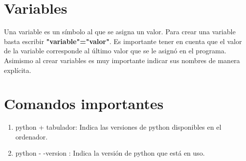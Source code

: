 \documentclass[letter paper, 12pt, oneside]{article}
\begin{document}
\section{Variables}

Una variable es un símbolo al que se asigna un valor. Para crear una variable basta escribir \textbf{"variable"="valor"}. Es importante tener en cuenta que el valor de la variable corresponde al último valor que se le asignó en el programa. Asimismo al crear variables es muy importante indicar sus nombres de manera explícita. 

\section{Comandos importantes}

\begin{enumerate}

\item{python + tabulador}: Indica las versiones de python disponibles en el ordenador.
 
\item{python - -version} : Indica la versión de python que está en uso.

\end{enumerate}
\end{document}
